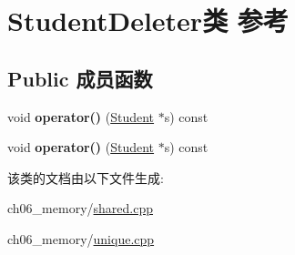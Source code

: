 \hypertarget{class_student_deleter}{}\section{Student\+Deleter类 参考}
\label{class_student_deleter}
\subsection*{Public 成员函数}
\begin{DoxyCompactItemize}
\item 
\mbox{\label{class_student_deleter_a97c2fbb595f5cbabbce7f2a5673acf92}} 
void {\bfseries operator()} (\mbox{\hyperlink{struct_student}{Student}} $\ast$s) const
\item 
\mbox{\label{class_student_deleter_a97c2fbb595f5cbabbce7f2a5673acf92}} 
void {\bfseries operator()} (\mbox{\hyperlink{struct_student}{Student}} $\ast$s) const
\end{DoxyCompactItemize}


该类的文档由以下文件生成\+:\begin{DoxyCompactItemize}
\item 
ch06\+\_\+memory/\mbox{\hyperlink{ch06__memory_2shared_8cpp}{shared.\+cpp}}\item 
ch06\+\_\+memory/\mbox{\hyperlink{unique_8cpp}{unique.\+cpp}}\end{DoxyCompactItemize}
